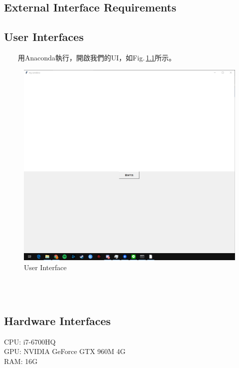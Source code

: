 \documentclass{scrreprt}
\begin{document}
\begin{CJK*}{UTF8}{bsmi}
\chapter{External Interface Requirements}

\section{User Interfaces}
　　用Anaconda執行，開啟我們的UI，如Fig.\,\ref{fig:3.1}所示。
\begin{figure}[h]
\begin{center}
\includegraphics[width=12.5cm]{UI.jpg} 
\end{center} 
\label{fig:3.1} 
\caption{User Interface} 
\end{figure}
　　\\
　　\\
\section{Hardware Interfaces}
CPU: i7-6700HQ\\
GPU: NVIDIA GeForce GTX 960M 4G\\
RAM: 16G\\



\end{CJK*}
\end{document}
